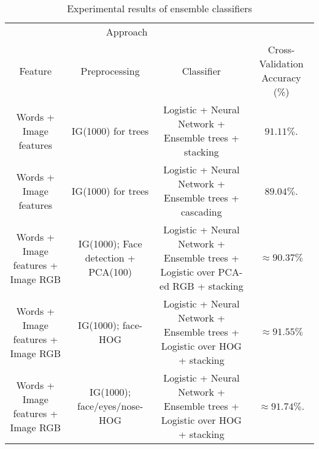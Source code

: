 \begin{table}[h!]
\centering
\begin{tabular}{ c c c c}
\hline
\multicolumn{3}{c}{Approach} \\
\cline{1-3}
Feature & Preprocessing & Classifier & Cross-Validation Accuracy (\%) \\
\hline
Words + Image features & IG(1000) for trees & Logistic + Neural Network + Ensemble trees + stacking & $91.11\%$. \\
Words + Image features & IG(1000) for trees & Logistic + Neural Network + Ensemble trees + cascading & $89.04\%$. \\
Words + Image features + Image RGB & IG(1000); Face detection + PCA(100) & Logistic + Neural Network + Ensemble trees + Logistic over PCA-ed RGB + stacking & $\approx 90.37\%$ \\
Words + Image features + Image RGB & IG(1000); face-HOG & Logistic + Neural Network + Ensemble trees + Logistic over HOG + stacking & $\approx 91.55\%$ \\
Words + Image features + Image RGB & IG(1000); face/eyes/nose-HOG & Logistic + Neural Network + Ensemble trees + Logistic over HOG + stacking & $\approx 91.74\%$. 
\end{tabular}
\caption{Experimental results of ensemble classifiers}
\label{Table 2}
\end{table}


